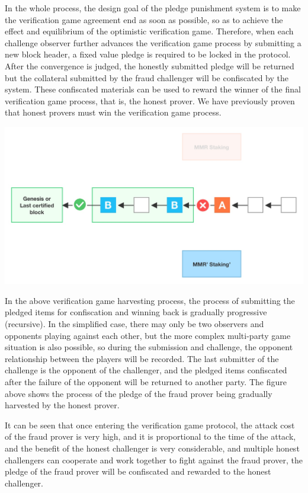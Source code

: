 In the whole process, the design goal of the pledge punishment system is to make the verification game agreement end as soon as possible, so as to achieve the effect and equilibrium of the optimistic verification game. Therefore, when each challenge observer further advances the verification game process by submitting a new block header, a fixed value pledge is required to be locked in the protocol. After the convergence is judged, the honestly submitted pledge will be returned but the collateral submitted by the fraud challenger will be confiscated by the system. These confiscated materials can be used to reward the winner of the final verification game process, that is, the honest prover. We have previously proven that honest provers must win the verification game process.

\includegraphics[scale=0.19]{pic/Verification Game Economic Model 2.jpg}

In the above verification game harvesting process, the process of submitting the pledged items for confiscation and winning back is gradually progressive (recursive). In the simplified case, there may only be two observers and opponents playing against each other, but the more complex multi-party game situation is also possible, so during the submission and challenge, the opponent relationship between the players will be recorded. The last submitter of the challenge is the opponent of the challenger, and the pledged items confiscated after the failure of the opponent will be returned to another party. The figure above shows the process of the pledge of the fraud prover being gradually harvested by the honest prover.

It can be seen that once entering the verification game protocol, the attack cost of the fraud prover is very high, and it is proportional to the time of the attack, and the benefit of the honest challenger is very considerable, and multiple honest challengers can cooperate and work together to fight against the fraud prover, the pledge of the fraud prover will be confiscated and rewarded to the honest challenger.


